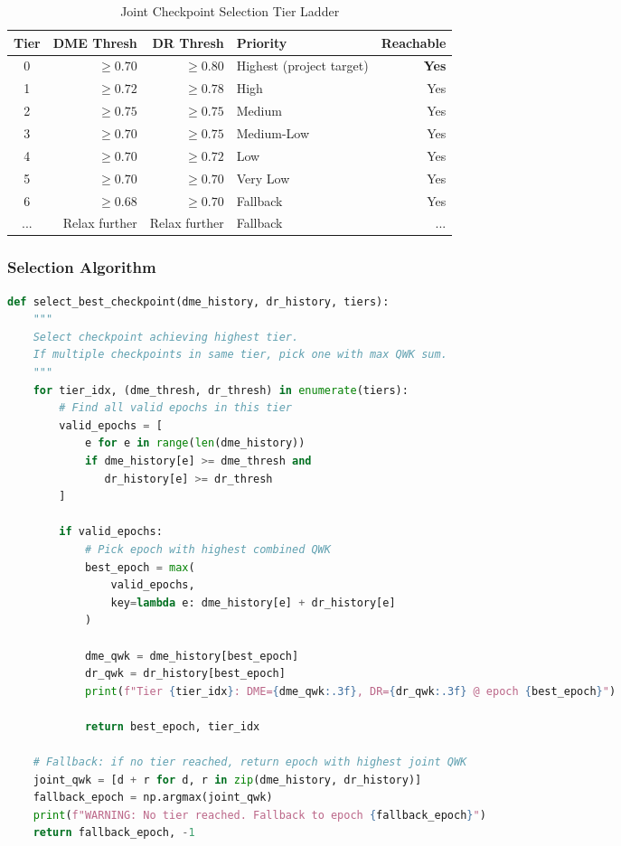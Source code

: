 \documentclass[12pt,a4paper]{article}
\begin{document}
\begin{table}[H]
\centering
\small
\caption{Joint Checkpoint Selection Tier Ladder}
\begin{tabular}{|c|r|r|l|r|}
\hline
\textbf{Tier} & \textbf{DME Thresh} & \textbf{DR Thresh} & \textbf{Priority} & \textbf{Reachable} \\
\hline
0 & $\geq 0.70$ & $\geq 0.80$ & Highest (project target) & \textbf{Yes} \\
1 & $\geq 0.72$ & $\geq 0.78$ & High & Yes \\
2 & $\geq 0.75$ & $\geq 0.75$ & Medium & Yes \\
3 & $\geq 0.70$ & $\geq 0.75$ & Medium-Low & Yes \\
4 & $\geq 0.70$ & $\geq 0.72$ & Low & Yes \\
5 & $\geq 0.70$ & $\geq 0.70$ & Very Low & Yes \\
6 & $\geq 0.68$ & $\geq 0.70$ & Fallback & Yes \\
... & Relax further & Relax further & Fallback & ... \\
\hline
\end{tabular}
\end{table}

\subsubsection{Selection Algorithm}

\begin{lstlisting}[language=python, caption=Joint Selection Algorithm]
def select_best_checkpoint(dme_history, dr_history, tiers):
    """
    Select checkpoint achieving highest tier.
    If multiple checkpoints in same tier, pick one with max QWK sum.
    """
    for tier_idx, (dme_thresh, dr_thresh) in enumerate(tiers):
        # Find all valid epochs in this tier
        valid_epochs = [
            e for e in range(len(dme_history))
            if dme_history[e] >= dme_thresh and
               dr_history[e] >= dr_thresh
        ]
        
        if valid_epochs:
            # Pick epoch with highest combined QWK
            best_epoch = max(
                valid_epochs,
                key=lambda e: dme_history[e] + dr_history[e]
            )
            
            dme_qwk = dme_history[best_epoch]
            dr_qwk = dr_history[best_epoch]
            print(f"Tier {tier_idx}: DME={dme_qwk:.3f}, DR={dr_qwk:.3f} @ epoch {best_epoch}")
            
            return best_epoch, tier_idx
    
    # Fallback: if no tier reached, return epoch with highest joint QWK
    joint_qwk = [d + r for d, r in zip(dme_history, dr_history)]
    fallback_epoch = np.argmax(joint_qwk)
    print(f"WARNING: No tier reached. Fallback to epoch {fallback_epoch}")
    return fallback_epoch, -1
\end{lstlisting}
\end{document}
